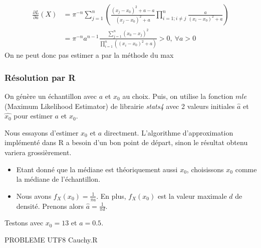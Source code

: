 \documentclass[12pt,a4paper,titlepage]{article}
\numberwithin{equation}{section}
\begin{document}
\begin{align*}
\frac{{\partial L}}{{\partial a}}\left( X \right) & = {\pi ^{ - n}}\sum\limits_{j = 1}^n {\left( {\frac{{{{\left( {{x_j} - {x_0}} \right)}^2} + a - a}}{{{{\left( {{x_j} - {x_0}} \right)}^2} + a}}\prod\limits_{i = 1;i \ne j}^n {\frac{a}{{{{\left( {{x_i} - {x_0}} \right)}^2} + a}}} } \right)}\\
&  = {\pi ^{ - n}}{a^{n - 1}}\frac{{\sum\limits_{j = 1}^n {{{\left( {{x_0} - {x_j}} \right)}^2}} }}{{\prod\limits_{i = 1}^n {\left( {{{\left( {{x_i} - {x_0}} \right)}^2} + a} \right)} }} > 0,\ \forall a > 0
\end{align*}
On ne peut donc pas estimer a par la méthode du max

\subsubsection*{Résolution par R}

On génère un échantillon avec $a$ et $x_0$ au choix. Puis, on utilise la fonction $mle$ (Maximum Likelihood Estimator) de librairie \emph{stats4} avec 2 valeurs initiales $\hat{a}$ et $\hat{x_0}$ pour estimer $a$ et $x_0$.

Nous essayons d'estimer $x_0$ et $a$ directment. L'algorithme d'approximation implémenté dans R a besoin d'un bon point de départ, sinon le résultat obtenu variera grossièrement.
\begin{itemize}
\item Etant donné que la médiane est théoriquement aussi $x_0$, choisissons $x_0$ comme la médiane de l'échantillon.
\item Nous avons ${f_X}\left( {{x_0}} \right) = \frac{1}{{\pi a}}$. En plus, $f_X(x_0)$ est la valeur maximale $d$ de densité. Prenons alors $\hat a = \frac{1}{{\pi d}}$.
\end{itemize}

Testons avec $x_0=13$ et $a=0.5$.

PROBLEME UTF8 Cauchy.R
%
\end{document}
